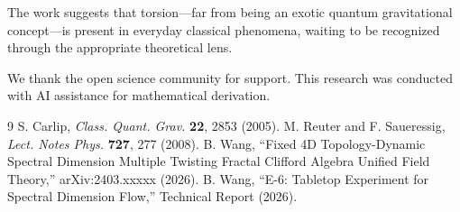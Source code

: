 \documentclass[aps,prl,twocolumn,superscriptaddress,floatfix]{revtex4-2}
\begin{document}
The work suggests that torsion---far from being an exotic quantum gravitational concept---is present in everyday classical phenomena, waiting to be recognized through the appropriate theoretical lens.

\begin{acknowledgments}
We thank the open science community for support. This research was conducted with AI assistance for mathematical derivation.
\end{acknowledgments}

\begin{thebibliography}{9}
 S. Carlip, \textit{Class. Quant. Grav.} \textbf{22}, 2853 (2005).
 M. Reuter and F. Saueressig, \textit{Lect. Notes Phys.} \textbf{727}, 277 (2008).
 B. Wang, ``Fixed 4D Topology-Dynamic Spectral Dimension Multiple Twisting Fractal Clifford Algebra Unified Field Theory,'' arXiv:2403.xxxxx (2026).
 B. Wang, ``E-6: Tabletop Experiment for Spectral Dimension Flow,'' Technical Report (2026).
\end{thebibliography}
\end{document}
